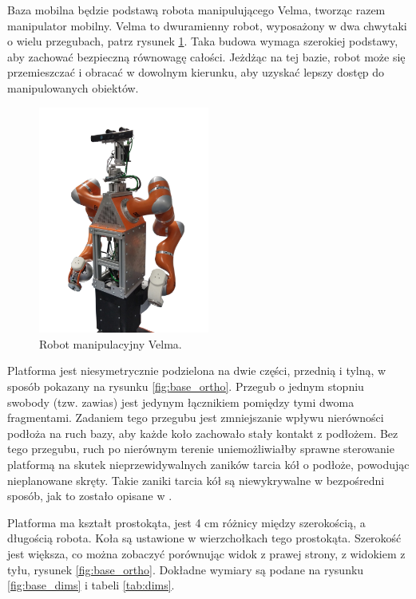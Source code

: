 	Baza mobilna będzie podstawą robota manipulującego Velma, tworząc razem manipulator mobilny.
	Velma to dwuramienny robot, wyposażony w dwa chwytaki o wielu przegubach, patrz rysunek \ref{fig:velma}.
	Taka budowa wymaga szerokiej podstawy, aby zachować bezpieczną równowagę całości.
	Jeżdżąc na tej bazie, robot może się przemieszczać i obracać w dowolnym kierunku, aby uzyskać lepszy dostęp do manipulowanych obiektów.

	\begin{figure}[H]
	\centering
	\includegraphics[width=0.5\textwidth]{graphics/velma.png}
	\caption{Robot manipulacyjny Velma.}
	\label{fig:velma}
	\end{figure} 

	Platforma jest niesymetrycznie podzielona na dwie części, przednią i tylną, w sposób pokazany na rysunku \ref{fig:base_ortho}.
	Przegub o jednym stopniu swobody (tzw. zawias) jest jedynym łącznikiem pomiędzy tymi dwoma fragmentami.
	Zadaniem tego przegubu jest zmniejszanie wpływu nierówności podłoża na ruch bazy, aby każde koło zachowało stały kontakt z podłożem.
	Bez tego przegubu, ruch po nierównym terenie uniemożliwiałby sprawne sterowanie platformą na skutek nieprzewidywalnych zaników tarcia kół o podłoże, powodując nieplanowane skręty.
	Takie zaniki tarcia kół są niewykrywalne w bezpośredni sposób, jak to zostało opisane w \cite{boringbot}.

	Platforma ma kształt prostokąta, jest 4 cm różnicy między szerokością, a długością robota.
	Koła są ustawione w wierzchołkach tego prostokąta.
	Szerokość jest większa, co można zobaczyć porównując widok z prawej strony, z widokiem z tyłu, rysunek \ref{fig:base_ortho}.
	Dokładne wymiary są podane na rysunku \ref{fig:base_dims} i tabeli \ref{tab:dims}.


